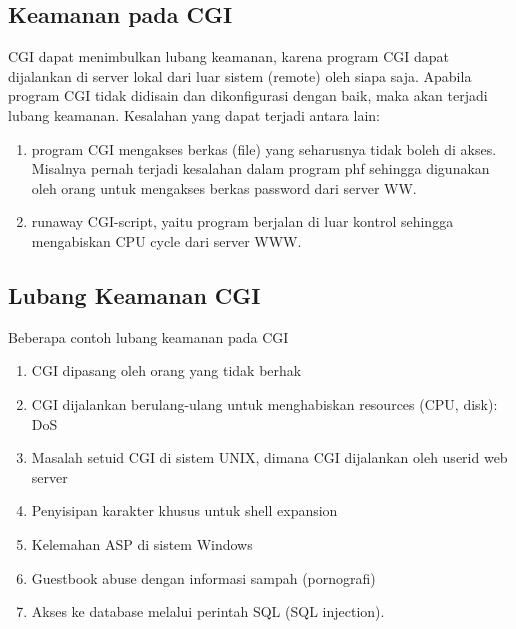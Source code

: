 \begin{enumerate}
\subsection{Keamanan pada CGI} 
CGI dapat menimbulkan lubang keamanan, karena program CGI dapat dijalankan di server lokal dari luar sistem (remote) oleh siapa saja. Apabila program CGI tidak didisain dan dikonfigurasi dengan baik, maka akan terjadi lubang keamanan. Kesalahan yang dapat terjadi antara lain: 
\begin{enumerate}
	\item program CGI mengakses berkas (file) yang seharusnya tidak boleh di akses. Misalnya pernah terjadi kesalahan dalam program phf sehingga digunakan oleh orang untuk mengakses berkas password dari server WW. 
	\item runaway CGI-script, yaitu program berjalan di luar kontrol sehingga mengabiskan CPU cycle dari server WWW.
\end{enumerate}

\subsection{Lubang Keamanan CGI} 
Beberapa contoh lubang keamanan pada CGI 
\begin{enumerate}
	\item CGI dipasang oleh orang yang tidak berhak 
	\item CGI dijalankan berulang-ulang untuk menghabiskan resources (CPU, disk): DoS 
	\item Masalah setuid CGI di sistem UNIX, dimana CGI dijalankan oleh userid web server 
	\item Penyisipan karakter khusus untuk shell expansion 
	\item Kelemahan ASP di sistem Windows 
	\item Guestbook abuse dengan informasi sampah (pornografi) 
	\item Akses ke database melalui perintah SQL (SQL injection).
\end {enumerate}


\end{enumerate}
